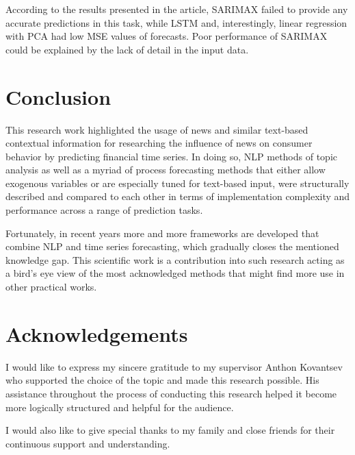 \documentclass[3p,times,procedia]{elsarticle}
\begin{document}
According to the results presented in the article, SARIMAX failed to provide any accurate predictions in this task, while LSTM and, interestingly, linear regression with PCA had low MSE values of forecasts. Poor performance of SARIMAX could be explained by the lack of detail in the input data.

\section{Conclusion}

This research work highlighted the usage of news and similar text-based contextual information for researching the influence of news on consumer behavior by predicting financial time series. In doing so, NLP methods of topic analysis as well as a myriad of process forecasting methods that either allow exogenous variables or are especially tuned for text-based input, were structurally described and compared to each other in terms of implementation complexity and performance across a range of prediction tasks.

Fortunately, in recent years more and more frameworks are developed that combine NLP and time series forecasting, which gradually closes the mentioned knowledge gap. This scientific work is a contribution into such research acting as a bird's eye view of the most acknowledged methods that might find more use in other practical works. 

\section*{Acknowledgements}

I would like to express my sincere gratitude to my supervisor Anthon Kovantsev who supported the choice of the topic and made this research possible. His assistance throughout the process of conducting this research helped it become more logically structured and helpful for the audience.

I would also like to give special thanks to my family and close friends for their continuous support and understanding.


\end{document}
